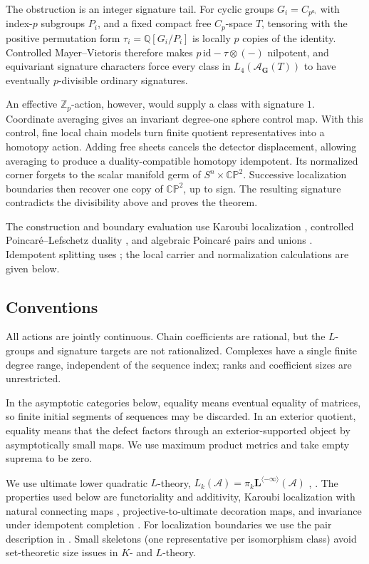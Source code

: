 \documentclass[11pt]{amsart}
\numberwithin{equation}{section}
\theoremstyle{definition}
\theoremstyle{remark}
\newcommand{\Q}{\mathbb Q}
\newcommand{\CP}{\mathbb {CP}}
\newcommand{\Zp}{\mathbb Z_p}
\newcommand{\Lspec}{\mathbf L^{\langle-\infty\rangle}}
\begin{document}
The obstruction is an integer signature tail. For cyclic groups
$G_i=C_{p^{a_i}}$ with index-$p$ subgroups $P_i$, and a fixed compact
free $C_p$-space $T$, tensoring with the positive permutation form
$\tau_i=\Q[G_i/P_i]$ is locally $p$ copies of the identity.
Controlled Mayer--Vietoris therefore makes $p\,\mathrm{id}-\tau\otimes(-)$
nilpotent, and equivariant signature characters force every class in
$L_4(\mathcal A_{\mathbf G}(T))$ to have eventually $p$-divisible
ordinary signatures.

An effective $\Zp$-action, however, would supply a class with signature $1$.
Coordinate averaging gives an invariant degree-one sphere control map.
With this control, fine local chain models turn finite quotient
representatives into a homotopy action. Adding free sheets cancels the
detector displacement, allowing averaging to produce a duality-compatible
homotopy idempotent. Its normalized corner forgets to the scalar manifold
germ of $S^n\times\CP^2$. Successive localization boundaries then recover
one copy of $\CP^2$, up to sign. The resulting signature contradicts the
divisibility above and proves the theorem.

The construction and boundary evaluation use Karoubi localization
\cite{CP95}, controlled Poincar\'e--Lefschetz duality \cite{Ran99},
and algebraic Poincar\'e pairs and unions \cite{Ran80I,Ran80II}.
Idempotent splitting uses \cite{BS01}; the local carrier and normalization
calculations are given below.

\subsection*{Conventions}
All actions are jointly continuous. Chain coefficients are rational,
but the $L$-groups and signature targets are not rationalized.
Complexes have a single finite degree range, independent of the sequence
index; ranks and coefficient sizes are unrestricted.

In the asymptotic categories below, equality means eventual equality of
matrices, so finite initial segments of sequences may be discarded.
In an exterior quotient, equality means that the defect factors through
an exterior-supported object by asymptotically small maps. We use maximum
product metrics and take empty suprema to be zero.

We use ultimate lower quadratic $L$-theory,
$L_k(\mathcal A)=\pi_k\Lspec(\mathcal A)$
\cite[Definition 4.16]{CP95}, \cite[\S17]{Ran92}.
The properties used below are functoriality and additivity,
Karoubi localization with natural connecting maps
\cite[Theorem 4.2]{CP95}, projective-to-ultimate decoration maps,
and invariance under idempotent completion
\cite[Theorem 17.2 and Definition 17.7]{Ran92}.
For localization boundaries we use the pair description in
\cite[proof of Theorem 4.1]{CP95}. Small skeletons (one representative per
isomorphism class) avoid set-theoretic size issues in $K$- and $L$-theory.
\end{document}
